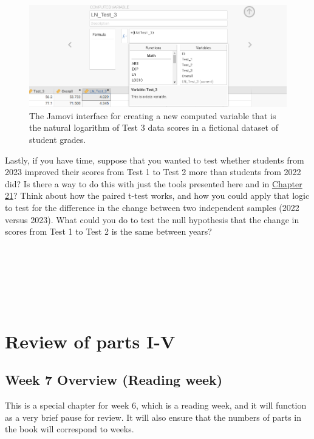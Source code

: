 \documentclass[
]{scrbook}
\begin{document}
\begin{figure}
\includegraphics[width=1\linewidth]{img/jamovi_LN_transform} \caption{The Jamovi interface for creating a new computed variable that is the natural logarithm of Test 3 data scores in a fictional dataset of student grades.}\label{fig:unnamed-chunk-105}
\end{figure}

Lastly, if you have time, suppose that you wanted to test whether students from 2023 improved their scores from Test 1 to Test 2 more than students from 2022 did?
Is there a way to do this with just the tools presented here and in \protect\hyperlink{Chapter_21}{Chapter 21}?
Think about how the paired t-test works, and how you could apply that logic to test for the difference in the change between two independent samples (2022 versus 2023).
What could you do to test the null hypothesis that the change in scores from Test 1 to Test 2 is the same between years?

\begin{verbatim}






\end{verbatim}

\hypertarget{part-review-of-parts-i-v}{%
\part{Review of parts I-V}\label{part-review-of-parts-i-v}}

\hypertarget{Week7}{%
\chapter*{Week 7 Overview (Reading week)}\label{Week7}}

This is a special chapter for week 6, which is a reading week, and it will function as a very brief pause for review. It will also ensure that the numbers of parts in the book will correspond to weeks.
\end{document}
